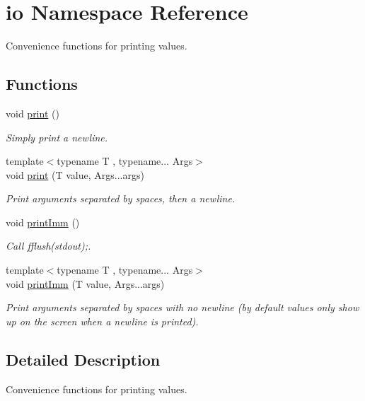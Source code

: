 \hypertarget{namespaceio}{\section{io Namespace Reference}
\label{namespaceio}
}


Convenience functions for printing values.  


\subsection*{Functions}
\begin{DoxyCompactItemize}
\item 
void \hyperlink{namespaceio_ad8499487f5202220fead59833138f4ab}{print} ()
\begin{DoxyCompactList}\small\item\em Simply print a newline. \end{DoxyCompactList}\item 
{\footnotesize template$<$typename T , typename... Args$>$ }\\void \hyperlink{namespaceio_ab9528b2fe57a002bb153f1b9f8dde743}{print} (T value, Args...\-args)
\begin{DoxyCompactList}\small\item\em Print arguments separated by spaces, then a newline. \end{DoxyCompactList}\item 
void \hyperlink{namespaceio_ae85db8edfd95c17427c2606360bb97af}{print\-Imm} ()
\begin{DoxyCompactList}\small\item\em Call {\ttfamily fflush(stdout);}. \end{DoxyCompactList}\item 
{\footnotesize template$<$typename T , typename... Args$>$ }\\void \hyperlink{namespaceio_ade4f05edb2cd007404540f67d416bd4a}{print\-Imm} (T value, Args...\-args)
\begin{DoxyCompactList}\small\item\em Print arguments separated by spaces with no newline (by default values only show up on the screen when a newline is printed). \end{DoxyCompactList}\end{DoxyCompactItemize}


\subsection{Detailed Description}
Convenience functions for printing values. 

